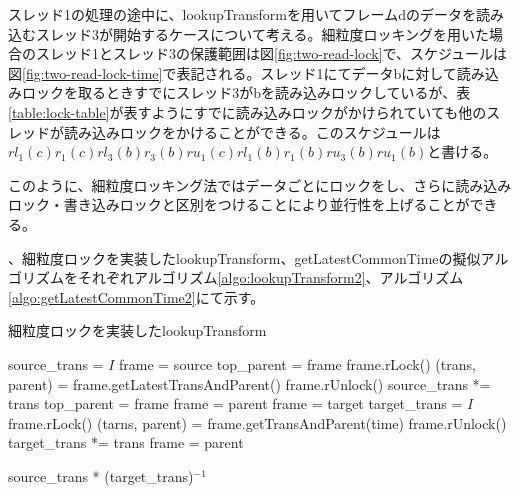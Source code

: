 \documentclass[a4paper]{jreport}	%
\begin{document}
スレッド1の処理の途中に、lookupTransformを用いてフレームdのデータを読み込むスレッド3が開始するケースについて考える。細粒度ロッキングを用いた場合のスレッド1とスレッド3の保護範囲は図\ref{fig:two-read-lock}で、スケジュールは図\ref{fig:two-read-lock-time}で表記される。スレッド1にてデータbに対して読み込みロックを取るときすでにスレッド3がbを読み込みロックしているが、表\ref{table:lock-table}が表すようにすでに読み込みロックがかけられていても他のスレッドが読み込みロックをかけることができる。このスケジュールは$rl_1(c)r_1(c)rl_3(b)r_3(b)ru_1(c)rl_1(b)r_1(b)ru_3(b)ru_1(b)$と書ける。


このように、細粒度ロッキング法ではデータごとにロックをし、さらに読み込みロック・書き込みロックと区別をつけることにより並行性を上げることができる。

、細粒度ロックを実装したlookupTransform、getLatestCommonTimeの擬似アルゴリズムをそれぞれアルゴリズム\ref{algo:lookupTransform2}、アルゴリズム\ref{algo:getLatestCommonTime2}にて示す。

\begin{algorithm}
  \caption{細粒度ロックを実装したlookupTransform}\label{algo:lookupTransform2}
\begin{algorithmic}[1]
	\EndIf
	\State source\_trans = $I$
	\State frame = source
	\State top\_parent = frame
	\State frame.rLock()
	\State (trans, parent) = frame.getLatestTransAndParent() 
	\State frame.rUnlock()
	\State source\_trans *= trans
	\State top\_parent = frame
	\State frame = parent
	\EndWhile
	\State frame = target
	\State target\_trans = $I$
	\State frame.rLock()
	\State (tarns, parent) = frame.getTransAndParent(time)
	\State frame.rUnlock()
	\State target\_trans *= trans
	\State frame = parent
	\EndWhile
	
	\Return source\_trans * (target\_trans)$^{-1}$
	\EndFunction
\end{algorithmic}
\end{algorithm}
\end{document}
